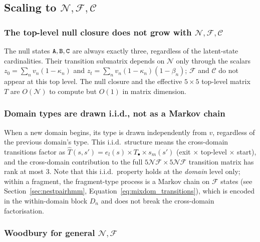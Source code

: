 \documentclass{article}
\newcommand\dom{n}
\newcommand\ndom{\mathcal{N}}
\newcommand\nfrag{\mathcal{F}}
\newcommand\domdist{v}
\newcommand\evoltime{t}
\newcommand\emptyseg{z}
\newcommand\nonemptytrans{T}
\newcommand\mnull{{\tt A}}
\newcommand\inull{{\tt B}}
\newcommand\dnull{{\tt C}}
\newcommand\effT{\hat{T}}
\newcommand\srcdom{l}
\newcommand\destdom{m}
\newcommand\nclasses{\mathcal{C}}
\begin{document}
\subsection{\texorpdfstring{Scaling to $\ndom, \nfrag, \nclasses$}{Scaling to N, F, C}}
\label{sec:scaling}

\subsubsection{\texorpdfstring{The top-level null closure does not grow with $\ndom, \nfrag, \nclasses$}{The top-level null closure does not grow with N, F, C}}

The null states $\mnull, \inull, \dnull$ are always exactly three,
regardless of the latent-state cardinalities. Their transition submatrix
depends on $\ndom$ only through the scalars
$\emptyseg_0 = \sum_\dom \domdist_\dom(1 - \kappa_\dom)$ and
$\emptyseg_\evoltime = \sum_\dom \domdist_\dom(1 - \kappa_\dom)(1 - \beta_\dom)$;
$\nfrag$ and $\nclasses$ do not appear at this top level.
The null closure and the effective $5 \times 5$ top-level matrix
$\nonemptytrans$ are $O(\ndom)$ to compute but $O(1)$ in matrix
dimension.

\subsubsection{Domain types are drawn i.i.d., not as a Markov chain}

When a new domain begins, its type is drawn independently from
$\domdist$, regardless of the previous domain's type. This i.i.d.\
structure means the cross-domain transitions factor as
$\effT(s, s') = e_\srcdom(s) \times \nonemptytrans_\bullet \times s_\destdom(s')$
(exit $\times$ top-level $\times$ start), and the cross-domain
contribution to the full $5\ndom\nfrag \times 5\ndom\nfrag$ transition
matrix has rank at most 3. Note that this i.i.d.\ property holds at
the \emph{domain} level only; within a fragment, the fragment-type
process is a Markov chain on $\nfrag$ states (see
Section~\ref{sec:nestpairhmm}, Equation~\ref{eq:mixdom_transitions}),
which is encoded in the within-domain block $D_\dom$ and does not
break the cross-domain factorisation.

\subsubsection{\texorpdfstring{Woodbury for general $\ndom, \nfrag$}{Woodbury for general N, F}}
\end{document}
